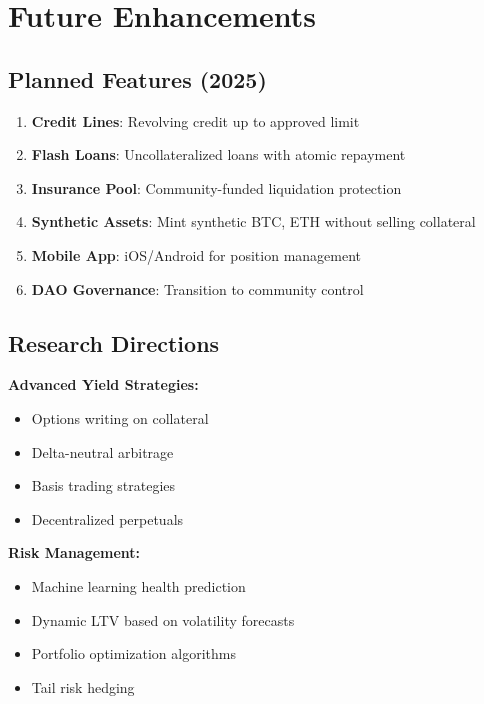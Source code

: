 \section{Future Enhancements}


\subsection{Planned Features (2025)}

\begin{enumerate}
\item \textbf{Credit Lines}: Revolving credit up to approved limit
\item \textbf{Flash Loans}: Uncollateralized loans with atomic repayment
\item \textbf{Insurance Pool}: Community-funded liquidation protection
\item \textbf{Synthetic Assets}: Mint synthetic BTC, ETH without selling collateral
\item \textbf{Mobile App}: iOS/Android for position management
\item \textbf{DAO Governance}: Transition to community control
\end{enumerate}

\subsection{Research Directions}

\textbf{Advanced Yield Strategies:}
\begin{itemize}
\item Options writing on collateral
\item Delta-neutral arbitrage
\item Basis trading strategies
\item Decentralized perpetuals
\end{itemize}

\textbf{Risk Management:}
\begin{itemize}
\item Machine learning health prediction
\item Dynamic LTV based on volatility forecasts
\item Portfolio optimization algorithms
\item Tail risk hedging
\end{itemize}

